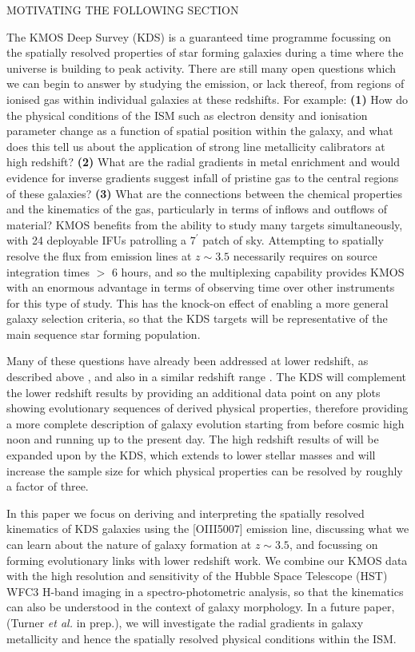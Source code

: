 \documentclass[a4paper,fleqn,usenatbib]{mn2e}
\begin{document}
MOTIVATING THE FOLLOWING SECTION

The KMOS Deep Survey (KDS) is a guaranteed time programme focussing on the spatially resolved properties of star forming galaxies during a time where the universe is building to peak activity.
There are still many open questions which we can begin to answer by studying the emission, or lack thereof, from regions of ionised gas within individual galaxies at these redshifts.
For example: \textbf{(1)} How do the physical conditions of the ISM such as electron density and ionisation parameter change as a function of spatial position within the galaxy, and what does this tell us about the application of strong line metallicity calibrators at high redshift?
\textbf{(2)} What are the radial gradients in metal enrichment and would evidence for inverse gradients suggest infall of pristine gas to the central regions of these galaxies?
\textbf{(3)} What are the connections between the chemical properties and the kinematics of the gas, particularly in terms of inflows and outflows of material?
KMOS benefits from the ability to study many targets simultaneously, with 24 deployable IFUs patrolling a $7^{\prime}$ patch of sky.
Attempting to spatially resolve the flux from emission lines at $z \sim 3.5$ necessarily requires on source integration times $>$ 6 hours, and so the multiplexing capability provides KMOS with an enormous advantage in terms of observing time over other instruments for this type of study.
This has the knock-on effect of enabling a more general galaxy selection criteria, so that the KDS targets will be representative of the main sequence star forming population. 

Many of these questions have already been addressed at lower redshift, as described above \citep{ForsterSchreiber2009,Wisnioski2015,Stott2016}, and also in a similar redshift range \cite{Gnerucci2011}.
The KDS will complement the lower redshift results by providing an additional data point on any plots showing evolutionary sequences of derived physical properties, therefore providing a more complete description of galaxy evolution starting from before cosmic high noon and running up to the present day.
The high redshift results of \cite{Gnerucci2011} will be expanded upon by the KDS, which extends to lower stellar masses and will increase the sample size for which physical properties can be resolved by roughly a factor of three.

In this paper we focus on deriving and interpreting the spatially resolved kinematics of KDS galaxies using the [OIII5007] emission line, discussing what we can learn about the nature of galaxy formation at $z \sim 3.5$, and focussing on forming evolutionary links with lower redshift work.
We combine our KMOS data with the high resolution and sensitivity of the Hubble Space Telescope (HST) WFC3 H-band imaging in a spectro-photometric analysis, so that the kinematics can also be understood in the context of galaxy morphology.
In a future paper, (Turner \textit{et al.} in prep.), we will investigate the radial gradients in galaxy metallicity and hence the spatially resolved physical conditions within the ISM.
\end{document}
